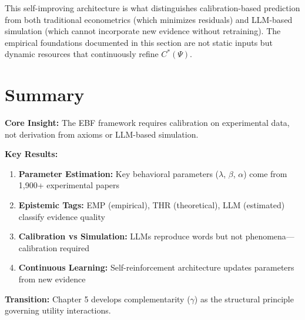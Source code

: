 This self-improving architecture is what distinguishes calibration-based prediction
from both traditional econometrics (which minimizes residuals) and LLM-based simulation
(which cannot incorporate new evidence without retraining). The empirical foundations
documented in this section are not static inputs but dynamic resources that continuously
refine $C^*(\Psi)$.

\begin{center}
\end{center}


\section{Summary}
\label{sec:ch4-summary}

\begin{tcolorbox}[
    colback=blue!5!white,
    colframe=blue!75!black,
    title={\textbf{Chapter 4 Summary: Empirical Foundations}}
]

\textbf{Core Insight:} The EBF framework requires calibration on experimental data, not derivation from axioms or LLM-based simulation.

\textbf{Key Results:}
\begin{enumerate}[nosep]
    \item \textbf{Parameter Estimation:} Key behavioral parameters ($\lambda$, $\beta$, $\alpha$) come from 1,900+ experimental papers
    \item \textbf{Epistemic Tags:} EMP (empirical), THR (theoretical), LLM (estimated) classify evidence quality
    \item \textbf{Calibration vs Simulation:} LLMs reproduce words but not phenomena---calibration required
    \item \textbf{Continuous Learning:} Self-reinforcement architecture updates parameters from new evidence
\end{enumerate}

\textbf{Transition:} Chapter 5 develops complementarity ($\gamma$) as the structural principle governing utility interactions.
\end{tcolorbox}

